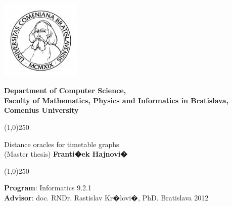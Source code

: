 \documentclass[a4paper]{article}
\begin{document}
    \setlength{\parindent}{0pt}
    \pagestyle{empty}
    \noindent

    \begin{center}
        \begin{minipage}{0.30\textwidth} \includegraphics[width=38mm]{logouk.png} \end{minipage}
        \begin{minipage}{0.69\textwidth}
        \textbf{\large\sc
            Department of Computer Science, \\
            Faculty of Mathematics, Physics and Informatics in Bratislava, \\
            Comenius University
        }
        \end{minipage}

        \vskip 5cm

        \begin{center} \line(1,0){250} \end{center}
        {\LARGE\sc Distance oracles for timetable graphs } \\
        \large{(Master thesis)}
        \vskip 0.5cm
        \textbf{\large Franti�ek Hajnovi�}
        \begin{center} \line(1,0){250} \end{center}

        \vfill
    \end{center}

    \textbf{Program}: Informatics 9.2.1 \\
    \textbf{Advisor}: doc. RNDr. Rastislav Kr�lovi�, PhD.   \hfill Bratislava 2012

    \pagebreak
\end{document}
